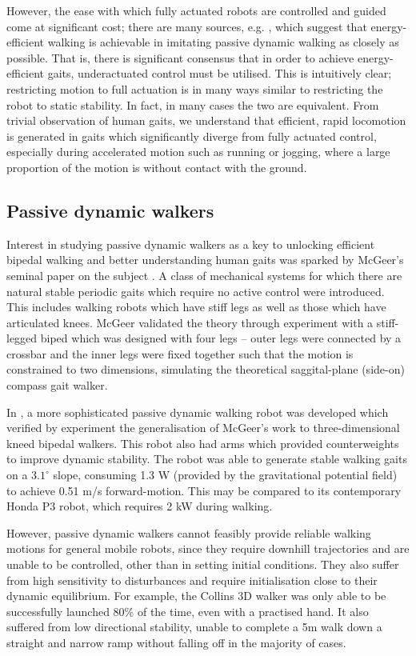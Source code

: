 However, the ease with which fully actuated robots are controlled and guided come at significant cost; there are many sources, e.g. \cite{mcgeer1990passive, asano2007dynamic, byl2008approximate}, which suggest that energy-efficient walking is achievable in imitating passive dynamic walking as closely as possible. That is, there is significant consensus that in order to achieve energy-efficient gaits, underactuated control must be utilised. This is intuitively clear; restricting motion to full actuation is in many ways similar to restricting the robot to static stability. In fact, in many cases the two are equivalent. From trivial observation of human gaits, we understand that efficient, rapid locomotion is generated in gaits which significantly diverge from fully actuated control, especially during accelerated motion such as running or jogging, where a large proportion of the motion is without contact with the ground.

\subsection{Passive dynamic walkers}
Interest in studying passive dynamic walkers as a key to unlocking efficient bipedal walking and better understanding human gaits was sparked by McGeer's seminal paper on the subject \cite{mcgeer1990passive}. A class of mechanical systems for which there are natural stable periodic gaits which require no active control were introduced. This includes walking robots which have stiff legs as well as those which have articulated knees. McGeer validated the theory through experiment with a stiff-legged biped which was designed with four legs -- outer legs were connected by a crossbar and the inner legs were fixed together such that the motion is constrained to two dimensions, simulating the theoretical saggital-plane (side-on) compass gait walker.

In \cite{collins2001three}, a more sophisticated passive dynamic walking robot was developed which verified by experiment the generalisation of McGeer's work to three-dimensional kneed bipedal walkers. This robot also had arms which provided counterweights to improve dynamic stability. The robot was able to generate stable walking gaits on a $3.1^{\circ}$ slope, consuming 1.3 W (provided by the gravitational potential field) to achieve 0.51 m/s forward-motion. This may be compared to its contemporary Honda P3 robot, which requires 2 kW during walking.

However, passive dynamic walkers cannot feasibly provide reliable walking motions for general mobile robots, since they require downhill trajectories and are unable to be controlled, other than in setting initial conditions. They also suffer from high sensitivity to disturbances and require initialisation close to their dynamic equilibrium. For example, the Collins 3D walker was only able to be successfully launched 80\% of the time, even with a practised hand. It also suffered from low directional stability, unable to complete a 5m walk down a straight and narrow ramp without falling off in the majority of cases.


